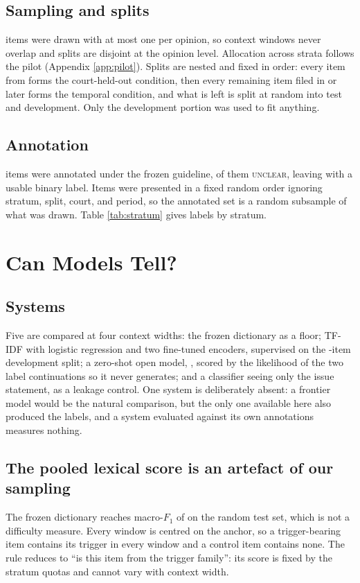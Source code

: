 

\subsection{Sampling and splits} \NDrawn{} items were drawn with at most one per
opinion, so context windows never overlap and splits are disjoint at the opinion
level. Allocation across strata follows the pilot (Appendix \ref{app:pilot}).
Splits are nested and fixed in order: every item from \HeldOutCourts{} forms the
court-held-out condition, then every remaining item filed in \TemporalCut{} or
later forms the temporal condition, and what is left is split at random into test
and development. Only the development portion was used to fit anything.

\subsection{Annotation} \NAnnotated{} items were annotated under the frozen
guideline, \NUnclear{} of them \textsc{unclear}, leaving \NBench{} with a
usable binary label. Items were presented in a fixed random order ignoring
stratum, split, court, and period, so the annotated set is a random subsample of
what was drawn. Table \ref{tab:stratum} gives labels by stratum.


\section{Can Models Tell?}
\label{sec:models}



\subsection{Systems} Five are compared at four context widths: the frozen
dictionary as a floor; TF-IDF with logistic regression and two fine-tuned
encoders, supervised on the \NDev{}-item development split; a zero-shot open
model, \LLMName{}, scored by the likelihood of the two label continuations so it
never generates; and a classifier seeing only the issue statement, as a leakage
control. One system is deliberately absent: a frontier model would be the natural
comparison, but the only one available here also produced the labels, and a
system evaluated against its own annotations measures nothing.

\subsection{The pooled lexical score is an artefact of our sampling} The frozen
dictionary reaches macro-$F_1$ of \LexF{} on the random test set, which is not a
difficulty measure. Every window is centred on the anchor, so a trigger-bearing
item contains its trigger in every window and a control item contains none. The
rule reduces to ``is this item from the trigger family'': its score is fixed by
the stratum quotas and cannot vary with context width.

